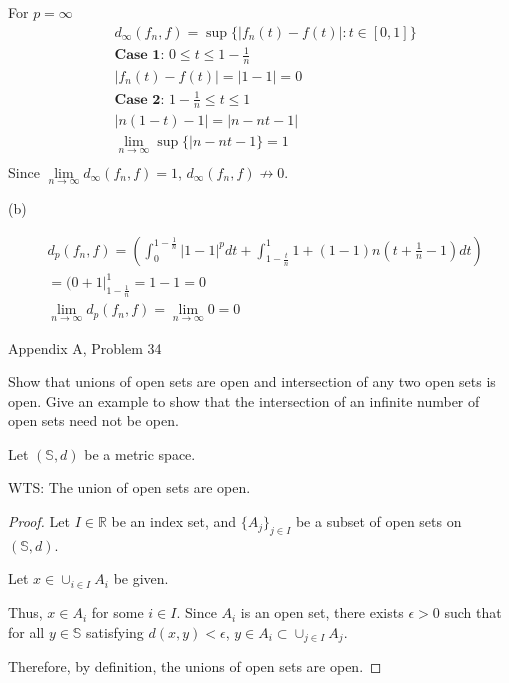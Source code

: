 \documentclass[12pt,letterpaper, onecolumn]{exam}
\newcommand{\real}{\mathbb{R}}
\newcommand{\Sbb}{\mathbb{S}}
\begin{document}
\begin{questions}
\begin{solution}
     For $p = \infty$
     \begin{align*}
         & d_{\infty}(f_n, f) = \sup\{|f_n(t) - f(t)|: t \in [0, 1]\} \\
         & \textbf{Case 1: } 0 \leq t \leq 1 - \tfrac{1}{n} \\
         & |f_n(t) - f(t)| = |1 - 1| = 0 \\
         & \textbf{Case 2: } 1 - \tfrac{1}{n} \leq t \leq 1\\
         & |n(1-t) - 1| = |n - nt - 1| \\
         & \lim\limits_{n \to \infty}\sup\{|n - nt - 1\} = 1 \\
     \end{align*}
     Since $\lim\limits_{n \to \infty}d_\infty(f_n, f) = 1$, $d_\infty(f_n, f) \nrightarrow 0$.

     (b)

     \begin{align*}
         & d_p(f_n, f) = \left(\int_0^{1-\tfrac{1}{n}}|1-1|^p dt +\int_{1 - \tfrac{t}{n}}^1 1 + (1 - 1)n(t + \frac{1}{n} - 1)dt\right) \\
         & = ( 0 + 1|_{1 - \tfrac{1}{n}}^1 = 1 - 1 = 0 \\
         & \lim\limits_{n \to \infty}d_p(f_n, f) = \lim\limits_{n \to \infty} 0 = 0 
     \end{align*}
    \end{solution}

    \question Appendix A, Problem 34
    
    Show that unions of open sets are open and intersection of any two open sets is open. Give an example to show that the intersection of an infinite number of open sets need not be open.

    \begin{solution} Let $(\Sbb, d)$ be a metric space.
    
      WTS: The union of open sets are open.
      \begin{proof} 
 Let $I \in \real$ be an index set, and $\{A_j\}_{j \in I}$ be a subset of open sets on $(\Sbb, d)$.

 Let $x \in \cup_{i \in I} A_i$ be given. 

 Thus, $x \in A_i$ for some $i \in I$. Since $A_i$ is an open set, there exists $\epsilon > 0$ such that for all $y \in \Sbb$ satisfying $d(x, y) < \epsilon$, $y \in A_i \subset \cup_{j \in I} A_j$.

 Therefore, by definition, the unions of open sets are open. 
      \end{proof}


\end{solution}
\end{questions}
\end{document}
